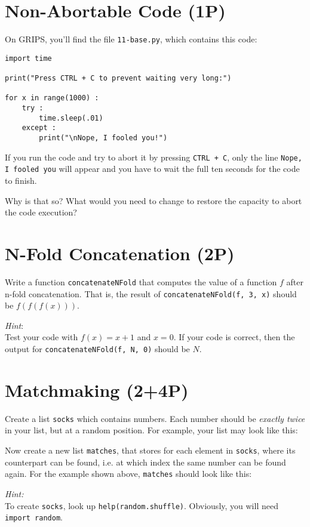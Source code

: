 \documentclass[
	ngerman,
	fontsize=10pt,
	parskip=half,
	titlepage=true,
	DIV=12
]{scrartcl}
\newcommand*{\inPy}[1]{\texttt{#1}}
\newcommand*{\ie}{i.\;e. }
\begin{document}
\section{Non-Abortable Code (1\;P)}
On GRIPS, you'll find the file \texttt{11-base.py}, which contains this code:
\begin{verbatim}
import time

print("Press CTRL + C to prevent waiting very long:")

for x in range(1000) :
    try :
        time.sleep(.01)
    except :
        print("\nNope, I fooled you!")
\end{verbatim}

If you run the code and try to abort it by pressing \texttt{CTRL + C}, only the line \texttt{Nope, I fooled you} will appear and you have to wait the full ten seconds for the code to finish.

Why is that so? What would you need to change to restore the capacity to abort the code execution?


\section{N-Fold Concatenation (2\;P)}
Write a function \texttt{concatenateNFold} that computes the value of a function $f$ after n-fold concatenation. That is, the result of 
\texttt{concatenateNFold(f, 3, x)}
should be $f(f(f(x)))$.

\emph{Hint}:\\
Test your code with $f(x) = x + 1$ and $x = 0$. If your code is correct, then the output for \texttt{concatenateNFold(f, N, 0)} should be $N$.


\section{Matchmaking (2+4\;P)}
Create a list \texttt{socks} which contains numbers. Each number should be \emph{exactly twice} in your list, but at a random position. For example, your list may look like this:

Now create a new list \texttt{matches}, that stores for each element in \texttt{socks}, where its counterpart can be found, \ie at which index the same number can be found again. For the example shown above, \texttt{matches} should look like this:

\emph{Hint:}\\
To create \texttt{socks}, look up \texttt{help(random.shuffle)}. Obviously, you will need \inPy{import random}.
\end{document}

